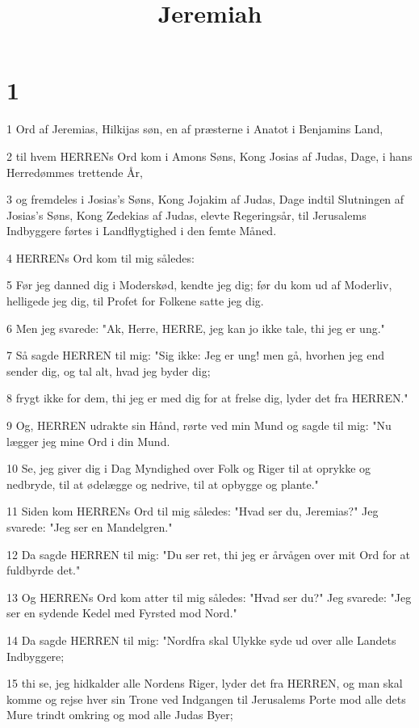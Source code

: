 

\title{Jeremiah}


\chapter{1}

\par 1 Ord af Jeremias, Hilkijas søn, en af præsterne i Anatot i Benjamins Land,
\par 2 til hvem HERRENs Ord kom i Amons Søns, Kong Josias af Judas, Dage, i hans Herredømmes trettende År,
\par 3 og fremdeles i Josias's Søns, Kong Jojakim af Judas, Dage indtil Slutningen af Josias's Søns, Kong Zedekias af Judas, elevte Regeringsår, til Jerusalems Indbyggere førtes i Landflygtighed i den femte Måned.
\par 4 HERRENs Ord kom til mig således:
\par 5 Før jeg danned dig i Moderskød, kendte jeg dig; før du kom ud af Moderliv, helligede jeg dig, til Profet for Folkene satte jeg dig.
\par 6 Men jeg svarede: "Ak, Herre, HERRE, jeg kan jo ikke tale, thi jeg er ung."
\par 7 Så sagde HERREN til mig: "Sig ikke: Jeg er ung! men gå, hvorhen jeg end sender dig, og tal alt, hvad jeg byder dig;
\par 8 frygt ikke for dem, thi jeg er med dig for at frelse dig, lyder det fra HERREN."
\par 9 Og, HERREN udrakte sin Hånd, rørte ved min Mund og sagde til mig: "Nu lægger jeg mine Ord i din Mund.
\par 10 Se, jeg giver dig i Dag Myndighed over Folk og Riger til at oprykke og nedbryde, til at ødelægge og nedrive, til at opbygge og plante."
\par 11 Siden kom HERRENs Ord til mig således: "Hvad ser du, Jeremias?" Jeg svarede: "Jeg ser en Mandelgren."
\par 12 Da sagde HERREN til mig: "Du ser ret, thi jeg er årvågen over mit Ord for at fuldbyrde det."
\par 13 Og HERRENs Ord kom atter til mig således: "Hvad ser du?" Jeg svarede: "Jeg ser en sydende Kedel med Fyrsted mod Nord."
\par 14 Da sagde HERREN til mig: "Nordfra skal Ulykke syde ud over alle Landets Indbyggere;
\par 15 thi se, jeg hidkalder alle Nordens Riger, lyder det fra HERREN, og man skal komme og rejse hver sin Trone ved Indgangen til Jerusalems Porte mod alle dets Mure trindt omkring og mod alle Judas Byer;
